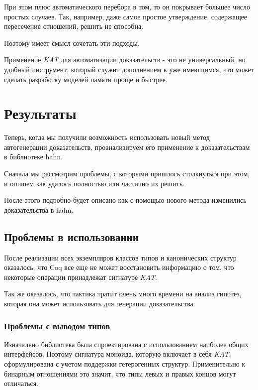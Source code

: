 \documentclass[times
              ]{itmo-student-thesis}
\begin{document}
    При этом плюс автоматического перебора в том, то он покрывает большее число простых
    случаев. Так, например, даже самое простое утверждение, содержащее пересечение отношений,
     решить не способна.

    Поэтому имеет смысл сочетать эти подходы.

  \chapterconclusion
    Применение \textit{KAT} для автоматизации доказательств - это не универсальный, но удобный
    инструмент, который служит дополнением к уже имеющимся, что может сделать  разработку моделей
    памяти проще и быстрее.

\chapter{Результаты}

  Теперь, когда мы получили возможность использовать новый метод автогенерации доказательств, проанализируем его
  применение к доказательствам в библиотеке hahn.

  Сначала мы рассмотрим проблемы, с которыми пришлось столкнуться при этом, и опишем как удалось полностью или
  частично их решить.

  После этого подробно будет описано как с помощью нового метода изменились доказательства в hahn.

  \section{Проблемы в использовании }
    После реализации всех экземпляров классов типов и канонических структур оказалось, что Coq все еще
    не может восстановить информацию о том, что некоторые операции принадлежат сигнатуре \textit{KAT}.

    Так же оказалось, что тактика  тратит очень много времени на анализ гипотез, которая она
    может использовать для генерации доказательства.
    \subsection{Проблемы с выводом типов}
      Изначально библиотека была спроектирована с использованием наиболее общих интерфейсов. Поэтому
      сигнатура моноида, которую включает в себя \textit{KAT}, сформулирована с учетом
      поддержки гетерогенных структур.
      Применительно к бинарным отношениями это значит, что типы левых и правых концов могут
      отличаться.
\end{document}
